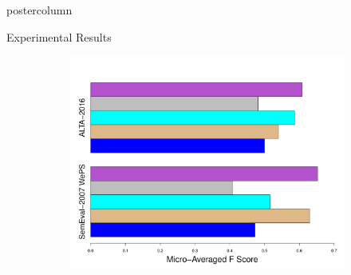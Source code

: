 \documentclass{beamer}
\begin{document}
\begin{frame}
\begin{columns}
\begin{column}{.5\textwidth}
\begin{beamercolorbox}[center]{postercolumn}
\begin{minipage}{.98\textwidth}
{\begin{block}{Experimental Results}
\begin{figure}
        \begin{figure}
							\begin{minipage}{1\textwidth}
								\centering\includegraphics[height=0.55\textwidth,width=1.25\textwidth,keepaspectratio]{img/ResultsWWW8.pdf}
							\end{minipage}
						\end{figure}
              \end{figure}
  
            \end{block}
         
}
\end{minipage}
\end{beamercolorbox}
\end{column}
\end{columns}
\end{frame}
\end{document}
